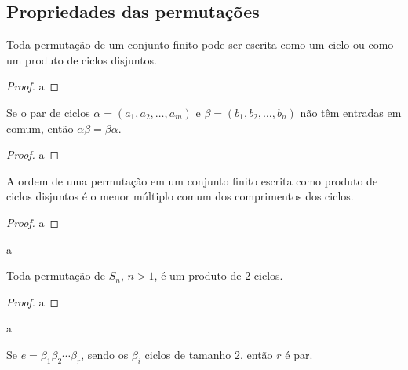     \subsection*{Propriedades das permutações}
    \begin{theorem}
    \label{teo-prod-ciclos-disj}
        Toda permutação de um conjunto finito pode ser escrita como um ciclo ou
        como um produto de ciclos disjuntos.
    \end{theorem}
    \begin{proof}
        a
    \end{proof}
    \begin{theorem}
    \label{teo-ciclos-disj-comutam}
        Se o par de ciclos $\alpha = (a_1, a_2, \dots, a_m)$ e $\beta = (b_1, b_2, \dots, b_n)$
        não têm entradas em comum, então $\alpha\beta = \beta\alpha$.
    \end{theorem}
    \begin{proof}
        a
    \end{proof}
    \begin{theorem}
    \label{teo-ordem-perm}
        A ordem de uma permutação em um conjunto finito escrita como produto de ciclos disjuntos
        é o menor múltiplo comum dos comprimentos dos ciclos.
    \end{theorem}
    \begin{proof}
        a
    \end{proof}
    \begin{example}
        a
    \end{example}
    \begin{theorem}
    \label{teo-perm-2ciclos}
        Toda permutação de $S_n$, $n>1$, é um produto de 2-ciclos.
    \end{theorem}
    \begin{proof}
        a
    \end{proof}
    \begin{example}
        a
    \end{example}
    \begin{lemma}
	\label{lema identidade permutacoes}
        Se $e = \beta_{1}\beta_{2}\cdots\beta_{r}$, sendo os $\beta_i$
        ciclos de tamanho 2, então $r$ é par.
	\end{lemma}
